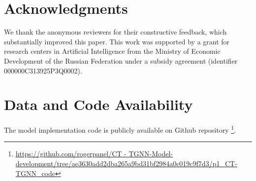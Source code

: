 \documentclass[lettersize,journal]{IEEEtran}
\begin{document}
\section*{Acknowledgments}

We thank the anonymous reviewers for their constructive feedback, which substantially improved this paper. This work was supported by a grant for research centers in Artificial Intelligence from the Ministry of Economic Development of the Russian Federation under a subsidy agreement (identifier 000000C313925P3Q0002).


\section*{Data and Code Availability}

The model implementation code is publicly available on Github repository \footnote{\url{https://github.com/rogerpanel/CT - TGNN-Model-development/tree/ae3630add2dba265a9bd31bf2984a0c019c9f7d3/p1_CT-TGNN_code}}. 
\end{document}
